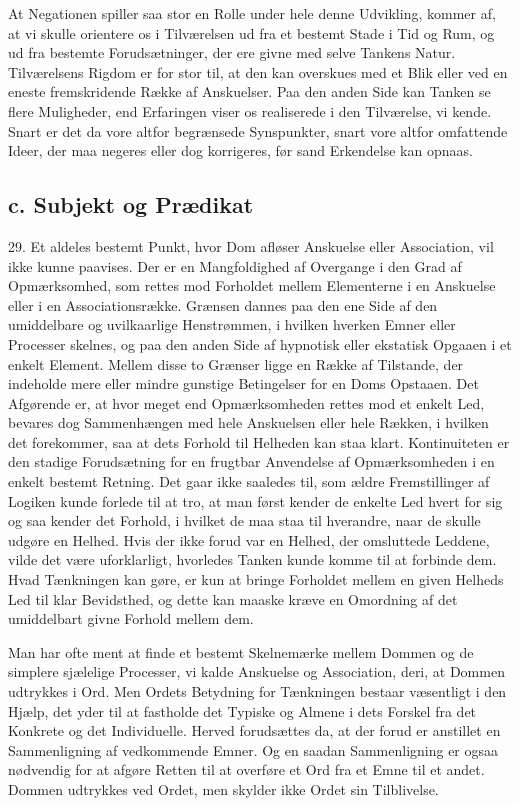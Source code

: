 \documentclass[12pt,a4paper]{book}
\newcommand{\apage}[1]{\marginnote{\footnotesize\textit{[#1]}}}
\begin{document}
At Negationen spiller saa stor en Rolle under hele denne Udvikling,
kommer af, at vi skulle orientere os i Tilværelsen ud fra et bestemt
Stade i Tid og Rum, og ud fra bestemte Forudsætninger, der ere givne med
selve Tankens Natur. Tilværelsens Rigdom er for stor til, at den kan
overskues med et Blik eller ved en eneste fremskridende Række af
Anskuelser. Paa den anden Side kan Tanken se flere Muligheder, end
Erfaringen viser os realiserede i den Tilværelse, vi kende. Snart er det
da vore altfor begrænsede Synspunkter, snart vore altfor omfattende
Ideer, der maa negeres eller dog korrigeres, før sand Erkendelse kan
opnaas.

\subsection*{c. Subjekt og Prædikat}
\label{ssec:subjekt-praedikat}

29. Et aldeles bestemt Punkt, hvor Dom afløser Anskuelse eller
Association, vil ikke kunne paavises. Der er en Mangfoldighed af
Overgange i den Grad af Opmærksomhed, som rettes mod Forholdet mellem
Elementerne i en Anskuelse eller i en Associationsrække. Grænsen dannes
paa den ene Side af den umiddelbare og uvilkaarlige Henstrømmen, i
hvilken hverken Emner eller Processer skelnes, og paa den anden Side af
hypnotisk eller ekstatisk Opgaaen i et enkelt Element. Mellem disse to
Grænser ligge en Række af Tilstande, der indeholde mere eller mindre
gunstige Betingelser for en Doms Opstaaen. Det Afgørende er, at hvor
meget end Opmærksomheden rettes mod et enkelt Led, bevares dog
Sammenhængen med hele Anskuelsen eller hele Rækken, i hvilken det
forekommer, saa at dets Forhold til Helheden \apage{83} kan staa klart.
Kontinuiteten er den stadige Forudsætning for en frugtbar Anvendelse af
Opmærksomheden i en enkelt bestemt Retning. Det gaar ikke saaledes til,
som ældre Fremstillinger af Logiken kunde forlede til at tro, at man
først kender de enkelte Led hvert for sig og saa kender det Forhold, i
hvilket de maa staa til hverandre, naar de skulle udgøre en Helhed. Hvis
der ikke forud var en Helhed, der omsluttede Leddene, vilde det være
uforklarligt, hvorledes Tanken kunde komme til at forbinde dem. Hvad
Tænkningen kan gøre, er kun at bringe Forholdet mellem en given Helheds
Led til klar Bevidsthed, og dette kan maaske kræve en Omordning af det
umiddelbart givne Forhold mellem dem.

Man har ofte ment at finde et bestemt Skelnemærke mellem Dommen og de
simplere sjælelige Processer, vi kalde Anskuelse og Association, deri, at
Dommen udtrykkes i Ord. Men Ordets Betydning for Tænkningen bestaar
væsentligt i den Hjælp, det yder til at fastholde det Typiske og Almene
i dets Forskel fra det Konkrete og det Individuelle. Herved forudsættes
da, at der forud er anstillet en Sammenligning af vedkommende Emner. Og
en saadan Sammenligning er ogsaa nødvendig for at afgøre Retten til at
overføre et Ord fra et Emne til et andet. Dommen udtrykkes ved Ordet,
men skylder ikke Ordet sin Tilblivelse.
\end{document}
